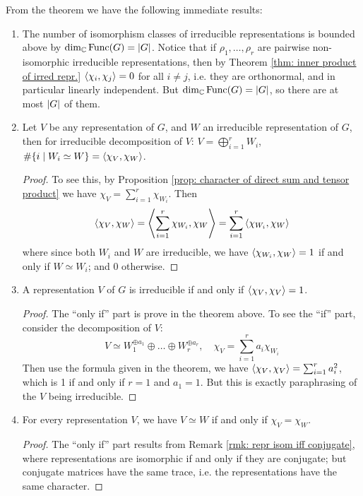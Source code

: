 \begin{corollary}\label{cor: inner prod. of repr.}
    From the theorem we have the following immediate results:
    \begin{enumerate}[label=\arabic*)]
        \item The number of isomorphism classes of irreducible representations is bounded above by $\dim_{\mathbb{C}} \mathrm{Func}(G) = \left|G\right|$. Notice that if $\rho_1, \dots, \rho_r$ are pairwise non-isomorphic irreducible representations, then by Theorem \ref{thm: inner product of irred repr.} $\left\langle \chi_i, \chi_j \right\rangle = 0$ for all $i \neq j$, i.e. they are orthonormal, and in particular linearly independent. But $\dim_{\mathbb{C}} \mathrm{Func}(G) = \left|G\right|$, so there are at most $\left|G\right|$ of them. 
        \item Let $V$ be any representation of $G$, and $W$ an irreducible representation of $G$, then for irreducible decomposition of $V$: $V = \bigoplus_{i = 1}^r W_i$, $\#\{ i \mid W_i \simeq W \} = \left\langle \chi_V, \chi_W \right\rangle$. 
        \begin{proof}
            To see this, by Proposition \ref{prop: character of direct sum and tensor product} we have $\chi_V = \sum_{i = 1}^r \chi_{W_i}$. Then
            \[
                \left\langle \chi_V, \chi_W \right\rangle = \left\langle \sum_{i = 1}^r \chi_{W_i}, \chi_W \right\rangle = \sum_{i = 1}^r \left\langle \chi_{W_i}, \chi_W \right\rangle
                \]
                where since both $W_i$ and $W$ are irreducible, we have $\left\langle \chi_{W_i}, \chi_W \right\rangle = 1$ if and only if $W \simeq W_i$; and 0 otherwise.
        \end{proof}
        \item A representation $V$ of $G$ is irreducible if and only if $\left\langle \chi_V, \chi_V \right\rangle = 1$.
        \begin{proof}
            The ``only if'' part is prove in the theorem above. To see the ``if'' part, consider the decomposition of $V$:
            \[
                V \simeq W_1^{\oplus a_1} \oplus \dots \oplus W_r^{\oplus a_r}, \quad \chi_V = \sum_{i = 1}^r a_i \chi_{W_i}
            \]
            Then use the formula given in the theorem, we have $\left\langle \chi_V, \chi_V \right\rangle = \sum_{i = 1}^r a_i^2$, which is 1 if and only if $r = 1$ and $a_1 = 1$. But this is exactly paraphrasing of the $V$ being irreducible.
        \end{proof}
        \item For every representation $V$, we have $V \simeq W$ if and only if $\chi_V = \chi_W$.
        \begin{proof}
            The ``only if'' part results from Remark \ref{rmk: repr isom iff conjugate}, where representations are isomorphic if and only if they are conjugate; but conjugate matrices have the same trace, i.e. the representations have the same character.


\end{proof}
\end{enumerate}
\end{corollary}
